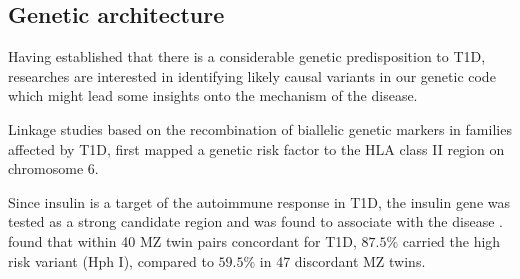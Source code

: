


\subsection{Genetic architecture}

Having established that there is a considerable genetic predisposition to T1D, researches are interested in identifying likely causal variants in our genetic code which might lead
some insights onto the mechanism of the disease.

Linkage studies based on the recombination of biallelic genetic markers in families affected by T1D,
first mapped a genetic risk factor to the HLA class II region on chromosome 6.

Since insulin is a target of the autoimmune response in T1D, the insulin gene  was tested as a strong candidate region and was found to associate with
the disease \citep{Metcalfe:2001}. 
\citet{Metcalfe:2001} found that within 40 \gls{MZ} twin pairs concordant for T1D, $87.5\%$ carried the high risk  variant (Hph I),
compared to $59.5\%$ in 47 discordant MZ twins.



